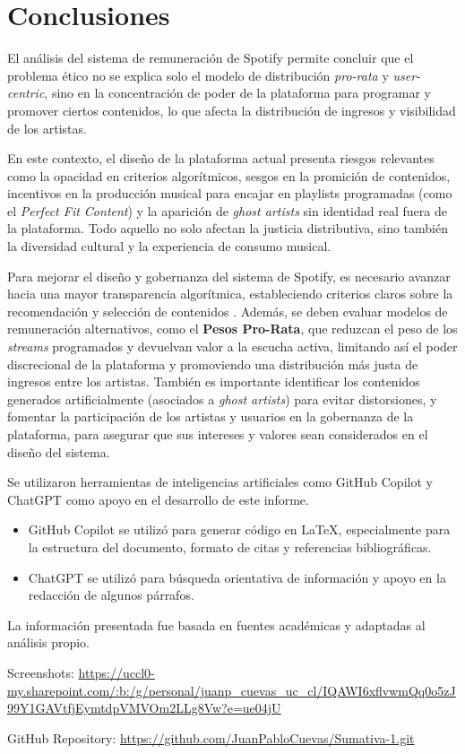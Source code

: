\documentclass[12pt,a4paper]{article}
\begin{document}
\section{Conclusiones}
El análisis del sistema de remuneración de Spotify permite concluir que el problema ético no se explica solo el modelo de distribución \textit{pro-rata} y \textit{user-centric}, sino en la concentración de poder de la plataforma para programar y promover ciertos contenidos, lo que afecta la distribución de ingresos y visibilidad de los artistas.

En este contexto, el diseño de la plataforma actual presenta riesgos relevantes como la opacidad en criterios algorítmicos, sesgos en la promición de contenidos, incentivos en la producción musical para encajar en playlists programadas (como el \textit{Perfect Fit Content}) y la aparición de \textit{ghost artists} sin identidad real fuera de la plataforma. Todo aquello no solo afectan la justicia distributiva, sino también la diversidad cultural y la experiencia de consumo musical.

Para mejorar el diseño y gobernanza del sistema de Spotify, es necesario avanzar hacia una mayor transparencia algorítmica, estableciendo criterios claros sobre la recomendación y selección de contenidos \cite{umaw_justice_spotify}. Además, se deben evaluar modelos de remuneración alternativos, como el \textbf{Pesos Pro-Rata}, que reduzcan el peso de los \textit{streams} programados y devuelvan valor a la escucha activa, limitando así el poder discrecional de la plataforma y promoviendo una distribución más justa de ingresos entre los artistas. También es importante identificar los contenidos generados artificialmente (asociados a \textit{ghost artists}) para evitar distorsiones, y fomentar la participación de los artistas y usuarios en la gobernanza de la plataforma, para asegurar que sus intereses y valores sean considerados en el diseño del sistema.

\newpage




Se utilizaron herramientas de inteligencias artificiales como GitHub Copilot y ChatGPT como apoyo en el desarrollo de este informe.

\begin{itemize}
	\item GitHub Copilot se utilizó para generar código en LaTeX, especialmente para la estructura del documento, formato de citas y referencias bibliográficas.

	\item ChatGPT se utilizó para búsqueda orientativa de información y apoyo en la redacción de algunos párrafos.
\end{itemize}

La información presentada fue basada en fuentes académicas y adaptadas al análisis propio.

Screenshots: \url{https://uccl0-my.sharepoint.com/:b:/g/personal/juanp_cuevas_uc_cl/IQAWI6xflvwmQq0o5zJ99Y1GAVtfjEymtdpVMVOm2LLg8Vw?e=ue04jU}

GitHub Repository: \url{https://github.com/JuanPabloCuevas/Sumativa-1.git}
\end{document}
